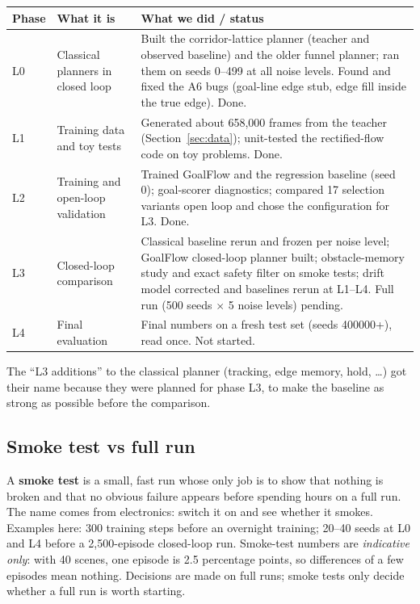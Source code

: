 \documentclass[11pt,a4paper]{article}
\newcommand{\term}[1]{\textbf{#1}}
\begin{document}
\begin{table}[h]
\small
\begin{tabularx}{\linewidth}{@{}lLL@{}}
\toprule
Phase & What it is & What we did / status \\
\midrule
L0 & Classical planners in closed loop & Built the corridor-lattice planner (teacher and observed baseline) and the older funnel planner; ran them on seeds 0--499 at all noise levels. Found and fixed the A6 bugs (goal-line edge stub, edge fill inside the true edge). Done. \\
L1 & Training data and toy tests & Generated about 658{,}000 frames from the teacher (Section~\ref{sec:data}); unit-tested the rectified-flow code on toy problems. Done. \\
L2 & Training and open-loop validation & Trained GoalFlow and the regression baseline (seed 0); goal-scorer diagnostics; compared 17 selection variants open loop and chose the configuration for L3. Done. \\
L3 & Closed-loop comparison & Classical baseline rerun and frozen per noise level; GoalFlow closed-loop planner built; obstacle-memory study and exact safety filter on smoke tests; drift model corrected and baselines rerun at L1--L4. Full run (500 seeds $\times$ 5 noise levels) pending. \\
L4 & Final evaluation & Final numbers on a fresh test set (seeds 400000+), read once. Not started. \\
\bottomrule
\end{tabularx}
\end{table}
The ``L3 additions'' to the classical planner (tracking, edge memory, hold, \dots) got their name because they
were planned for phase L3, to make the baseline as strong as possible before the comparison.

\subsection{Smoke test vs full run}
A \term{smoke test} is a small, fast run whose only job is to show that nothing is broken and that no
obvious failure appears before spending hours on a full run. The name comes from electronics: switch it on
and see whether it smokes. Examples here: 300 training steps before an overnight training; 20--40 seeds at
L0 and L4 before a 2{,}500-episode closed-loop run. Smoke-test numbers are \emph{indicative only}: with 40
scenes, one episode is 2.5 percentage points, so differences of a few episodes mean nothing. Decisions
are made on full runs; smoke tests only decide whether a full run is worth starting.
\end{document}
